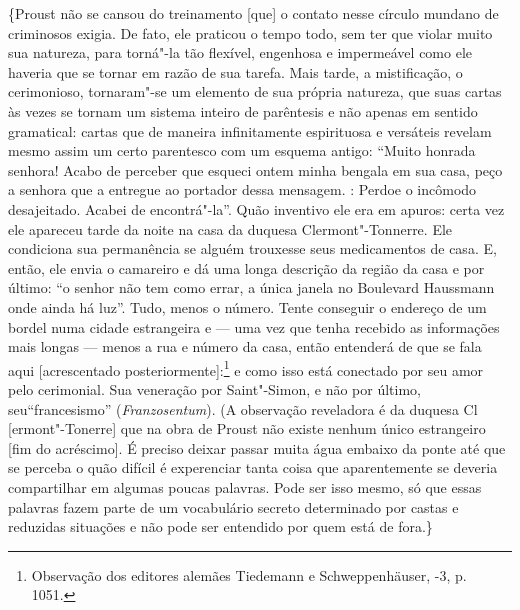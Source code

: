 \{Proust não se cansou do treinamento {[}que{]} o contato nesse círculo
mundano de criminosos exigia. De fato, ele praticou o tempo todo, sem
ter que violar muito sua natureza, para torná"-la tão flexível, engenhosa
e impermeável como ele haveria que se tornar em razão de sua tarefa.
Mais tarde, a mistificação, o cerimonioso, tornaram"-se um elemento de
sua própria natureza, que suas cartas às vezes se tornam um sistema
inteiro de parêntesis e não apenas em sentido gramatical: cartas que de
maneira infinitamente espirituosa e versáteis revelam mesmo assim um
certo parentesco com um esquema antigo: ``Muito honrada senhora! Acabo
de perceber que esqueci ontem minha bengala em sua casa, peço a senhora
que a entregue ao portador dessa mensagem. : Perdoe o incômodo
desajeitado. Acabei de encontrá"-la''. Quão inventivo ele era em apuros:
certa vez ele apareceu tarde da noite na casa da duquesa
Clermont"-Tonnerre. Ele condiciona sua permanência se alguém trouxesse
seus medicamentos de casa. E, então, ele envia o camareiro e dá uma
longa descrição da região da casa e por último: ``o senhor não tem como
errar, a única janela no Boulevard Haussmann onde ainda há luz''. Tudo,
menos o número. Tente conseguir o endereço de um bordel numa cidade
estrangeira e --- uma vez que tenha recebido as informações mais longas ---
menos a rua e número da casa, então entenderá de que se fala aqui
{[}acrescentado posteriormente{]}:\footnote{Observação dos editores
  alemães Tiedemann e Schweppenhäuser, -3, p. 1051. \versal{[N. E.]}} e
como isso está conectado por seu amor pelo cerimonial. Sua veneração por
Saint"-Simon, e não por último, seu``francesismo'' (\emph{Franzosentum}).
(A observação reveladora é da duquesa Cl {[}ermont"-Tonerre{]} que na
obra de Proust não existe nenhum único estrangeiro {[}fim do
acréscimo{]}. É preciso deixar passar muita água embaixo da ponte até
que se perceba o quão difícil é experenciar tanta coisa que
aparentemente se deveria compartilhar em algumas poucas palavras. Pode
ser isso mesmo, só que essas palavras fazem parte de um vocabulário
secreto determinado por castas e reduzidas situações e não pode ser
entendido por quem está de fora.\}

